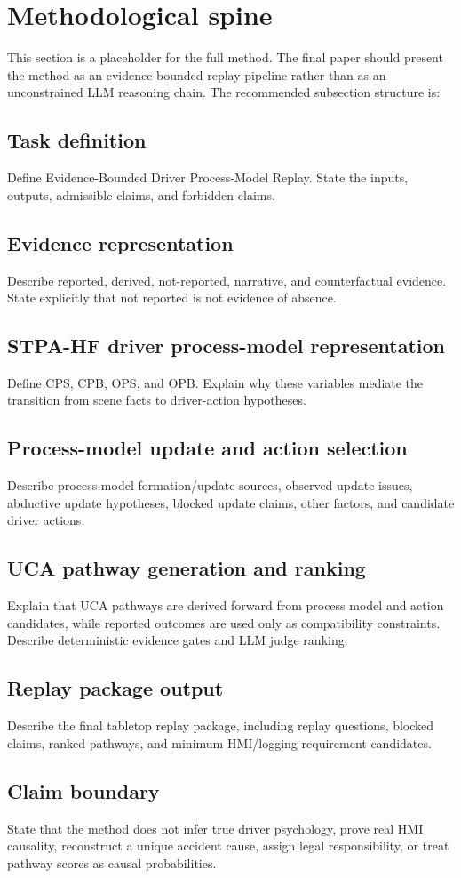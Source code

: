 \section{Methodological spine}
\label{sec:method}

This section is a placeholder for the full method. The final paper should present the method as an evidence-bounded replay pipeline rather than as an unconstrained LLM reasoning chain. The recommended subsection structure is:

\subsection{Task definition}
Define Evidence-Bounded Driver Process-Model Replay. State the inputs, outputs, admissible claims, and forbidden claims.

\subsection{Evidence representation}
Describe reported, derived, not-reported, narrative, and counterfactual evidence. State explicitly that not reported is not evidence of absence.

\subsection{STPA-HF driver process-model representation}
Define CPS, CPB, OPS, and OPB. Explain why these variables mediate the transition from scene facts to driver-action hypotheses.

\subsection{Process-model update and action selection}
Describe process-model formation/update sources, observed update issues, abductive update hypotheses, blocked update claims, other factors, and candidate driver actions.

\subsection{UCA pathway generation and ranking}
Explain that UCA pathways are derived forward from process model and action candidates, while reported outcomes are used only as compatibility constraints. Describe deterministic evidence gates and LLM judge ranking.

\subsection{Replay package output}
Describe the final tabletop replay package, including replay questions, blocked claims, ranked pathways, and minimum HMI/logging requirement candidates.

\subsection{Claim boundary}
State that the method does not infer true driver psychology, prove real HMI causality, reconstruct a unique accident cause, assign legal responsibility, or treat pathway scores as causal probabilities.
